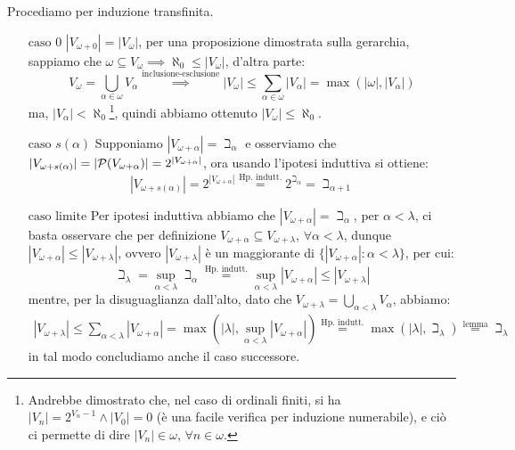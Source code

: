 \begin{soln}
	Procediamo per induzione transfinita.
	\begin{itemize}
		\item[$\boxed{\text{caso 0}}$] $|V_{\omega + 0}| = |V_{\omega}|$, per una proposizione dimostrata sulla gerarchia, sappiamo che $\omega \subseteq V_{\omega} \implies \aleph_0 \leq |V_{\omega}|$, d'altra parte:
		\[ V_{\omega} = \bigcup_{\alpha \in \omega} V_{\alpha} \overset{\text{inclusione-esclusione}}{\implies} |V_\omega| \leq \sum_{\alpha \in \omega} |V_{\alpha}| = \max(|\omega|,|V_\alpha|)
			\]
		ma, $|V_\alpha| < \aleph_0$\footnote{Andrebbe dimostrato che, nel caso di ordinali finiti, si ha $|V_n| = 2^{V_n-1} \land |V_0| = 0$ (è una facile verifica per induzione numerabile), e ciò ci permette di dire $|V_n| \in \omega$, $\forall n \in \omega$.}, quindi abbiamo ottenuto $|V_\omega| \leq \aleph_0$. 
		\item[$\boxed{\text{caso $s(\alpha)$}}$] Supponiamo $|V_{\omega + \alpha}| = \beth_{\alpha}$ e osserviamo che $|V_{\omega + s(\alpha)}| = |\mathcal{P}(V_{\omega + \alpha})| = 2^{|V_{\omega + \alpha}|}$, ora usando l'ipotesi induttiva si ottiene:
		\[ |V_{\omega + s(\alpha)}| = 2^{|V_{\omega + \alpha}|} \overset{\text{Hp. indutt.}}{=} 2^{\beth_\alpha} = \beth_{\alpha + 1}
			\]
		\item[$\boxed{\text{caso limite}}$] Per ipotesi induttiva abbiamo che $|V_{\omega + \alpha}| = \beth_\alpha$, per $\alpha < \lambda$, ci basta osservare che per definizione $V_{\omega + \alpha} \subseteq V_{\omega + \lambda}$, $\forall \alpha < \lambda$, dunque $|V_{\omega + \alpha}| \leq |V_{\omega + \lambda}|$,
		ovvero $|V_{\omega + \lambda}|$ è un maggiorante di $\{|V_{\omega + \alpha}| : \alpha < \lambda\}$, per cui:
		\[ \beth_\lambda = \sup_{\alpha < \lambda} \beth_{\alpha} \overset{\text{Hp. indutt.}}{=} \sup_{\alpha < \lambda} |V_{\omega + \alpha}| \leq |V_{\omega + \lambda}|
			\]
		mentre, per la disuguaglianza dall'alto, dato che $V_{\omega + \lambda} = \bigcup_{\alpha < \lambda} V_{\alpha}$, abbiamo:
		\begin{align*}
			|V_{\omega + \lambda}| \leq \sum_{\alpha < \lambda} |V_{\omega + \alpha}|
								   = \max\left(|\lambda|,\sup_{\alpha < \lambda} |V_{\omega + \alpha}|\right)
								   \overset{\text{Hp. indutt.}}{=} \max(|\lambda|,\beth_\lambda)
								   \overset{\text{lemma}}{=} \beth_\lambda
		\end{align*}
		in tal modo concludiamo anche il caso successore.
	\end{itemize}
\end{soln}

